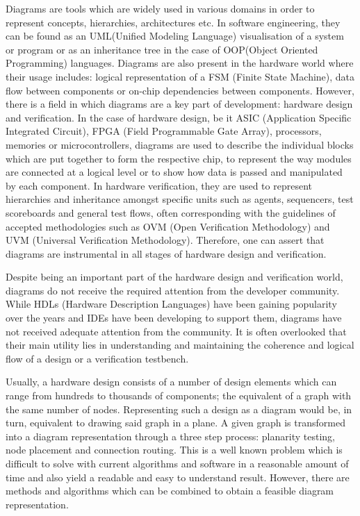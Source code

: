 Diagrams are tools which are widely used in various domains in order to represent
concepts, hierarchies, architectures etc. In software engineering, they can be found as
an UML(Unified Modeling Language) visualisation of a system or program or as an inheritance
tree in the case of OOP(Object Oriented Programming) languages. Diagrams are also present 
in the hardware world where their usage includes: logical representation of a FSM (Finite State Machine), 
data flow between components or on-chip dependencies between components. However, there is a field in 
which diagrams are a key part of development: hardware design and verification. In the case of hardware design, 
be it ASIC (Application Specific Integrated Circuit), FPGA (Field Programmable Gate Array), processors, memories or
microcontrollers, diagrams are used to describe the individual blocks which are put together to form the respective chip, 
to represent the way modules are connected at a logical level or to show how data is passed and manipulated by each component. 
In hardware verification, they are used to represent hierarchies and inheritance amongst specific units such as agents, 
sequencers, test scoreboards and general test flows, often corresponding with the guidelines of accepted methodologies such
as OVM (Open Verification Methodology) and UVM (Universal Verification Methodology). Therefore, one can assert that diagrams 
are instrumental in all stages of hardware design and verification.

Despite being an important part of the hardware design and verification world, diagrams do not receive the required attention 
from the developer community. While HDLs (Hardware Description Languages) have been gaining popularity over the years and IDEs 
have been developing to support them, diagrams have not received adequate attention from the community. It is often 
overlooked that their main utility lies in understanding and maintaining the coherence and logical flow of a design
or a verification testbench. 

Usually, a hardware design consists of a number of design elements which can range from hundreds to thousands of components; 
the equivalent of a graph with the same number of nodes. Representing such a design as a diagram would be, in turn, equivalent to 
drawing said graph in a plane. A given graph is transformed into a diagram representation through a three step process: planarity 
testing, node placement and connection routing. This is a well known problem which is difficult 
to solve with current algorithms and software in a reasonable amount of time and also yield a readable and easy to understand result. However, there are methods and 
algorithms which can be combined to obtain a feasible diagram representation. 

